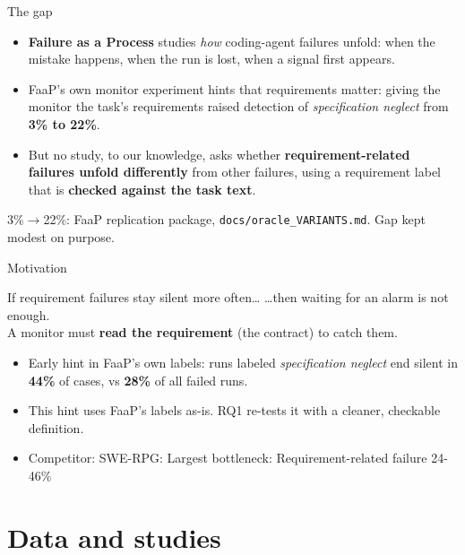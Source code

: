 \documentclass[aspectratio=169,11pt]{beamer}
\newcommand{\fine}[1]{{\scriptsize\color{gray}#1}}
\begin{document}
\begin{frame}{The gap}
  \begin{itemize}
    \item \textbf{Failure as a Process} studies \emph{how} coding-agent failures unfold:
      when the mistake happens, when the run is lost, when a signal first appears.
    \item FaaP's own monitor experiment hints that requirements matter:
      giving the monitor the task's requirements raised detection of \emph{specification neglect}
      from \textbf{3\% to 22\%}.
    \item But no study, to our knowledge, asks whether \textbf{requirement-related failures unfold differently}
      from other failures, using a requirement label that is \textbf{checked against the task text}.
  \end{itemize}
  \vfill
  \fine{3\%$\rightarrow$22\%: FaaP replication package, \texttt{docs/oracle\_VARIANTS.md}. Gap kept modest on purpose.}
\end{frame}

\begin{frame}{Motivation}
  \begin{block}{If requirement failures stay silent more often\dots}
    \dots then waiting for an alarm is not enough.\\
    A monitor must \textbf{read the requirement} (the contract) to catch them.
  \end{block}
  \vspace{6pt}
  \begin{itemize}
    \item Early hint in FaaP's own labels: runs labeled \emph{specification neglect} end silent in
      \textbf{44\%} of cases, vs \textbf{28\%} of all failed runs.
    \item This hint uses FaaP's labels as-is. RQ1 re-tests it with a cleaner, checkable definition.
    \item Competitor: SWE-RPG: Largest bottleneck: Requirement-related failure 24-46\%
  \end{itemize}
\end{frame}

\section{Data and studies}
\end{document}
